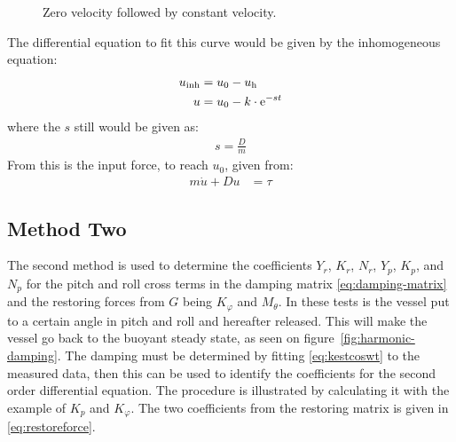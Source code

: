 \begin{figure}[htbp]
	\centering
	
	\caption{Zero velocity followed by constant velocity.}
	\label{fig:phase1}
\end{figure}
The differential equation to fit this curve would be given by the inhomogeneous equation:
\begin{align}
u_{\text{inh}} &= u_0 - u_{\text{h}}\\
u &= u_0 - k \cdot \mathrm{e}^{-st}
\end{align}
where the $s$ still would be given as:
\begin{align}
s = \frac{D}{m}
\end{align}
From this is the input force, to reach $u_0$, given from:
\begin{align}
m \dot u + Du &= \tau
\end{align}

\subsection{Method Two}
\label{subsec:methodtwo}
The second method is used to determine the coefficients $Y_r$, $K_r$,
$N_r$, $Y_p$, $K_p$, and $N_p$ for the pitch and
roll cross terms in the damping matrix \eqref{eq:damping-matrix} and the restoring forces from $G$ being $K_\varphi$ and $M_\theta$. In
these tests is the vessel put to a certain angle in pitch and roll and
hereafter released. This will make the vessel go back to the buoyant
steady state, as seen on figure~\vref{fig:harmonic-damping}. The
damping must be determined by fitting \eqref{eq:kestcoswt} to the
measured data, then this can be used to identify the coefficients for
the second order differential equation. The procedure is illustrated by
calculating it with the example of $K_p$ and $K_\varphi$. The two coefficients from the restoring matrix is given in \ref{eq:restoreforce}.

